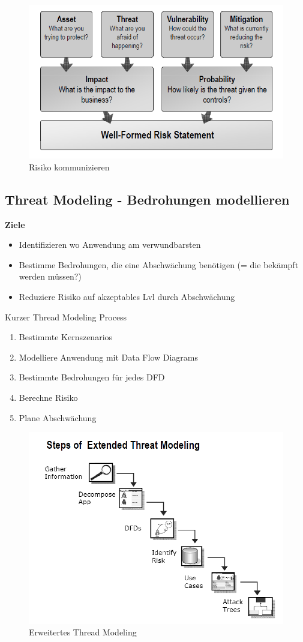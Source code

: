 \begin{figure}[!h]
	\centering
	\includegraphics[scale=0.7]{img/comm_risk.png}
	\caption{Risiko kommunizieren}
\end{figure}

\newpage
\subsection{Threat Modeling - Bedrohungen modellieren}
\textbf{Ziele}
\begin{itemize}
	\item Identifizieren wo Anwendung am verwundbarsten
	\item Bestimme Bedrohungen, die eine Abschwächung benötigen (= die bekämpft werden müssen?)
	\item Reduziere Risiko auf akzeptables Lvl durch Abschwächung
\end{itemize}

Kurzer Thread Modeling Process
\begin{enumerate}
	\item Bestimmte Kernszenarios
	\item Modelliere Anwendung mit Data Flow Diagrams
	\item Bestimmte Bedrohungen für jedes DFD
	\item Berechne Risiko
	\item Plane Abschwächung
\end{enumerate}

\begin{figure}[!h]
	\centering
	\includegraphics[scale=0.7]{img/extended_thread_modeling.png}
	\caption{Erweitertes Thread Modeling}
\end{figure}
